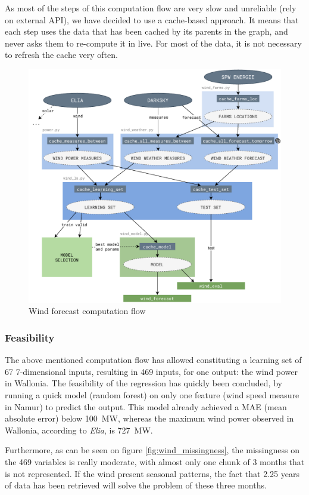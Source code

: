 \documentclass[a4paper, 12pt]{article}
\begin{document}
	As most of the steps of this computation flow are very slow and unreliable (rely on external API), we have decided to use a cache-based approach. It means that each step uses the data that has been cached by its parents in the graph, and never asks them to re-compute it in live. For most of the data, it is not necessary to refresh the cache very often.

	\begin{figure}[H]
		\centering
		\includegraphics[width=.8\textwidth]{resources/pdf/diagram_wind.pdf}
		\caption{Wind forecast computation flow}
		\label{fig:wind_computation_flow}
	\end{figure}


	\subsubsection{Feasibility}

	The above mentioned computation flow has allowed constituting a learning set of 67 7-dimensional inputs, resulting in 469 inputs, for one output: the wind power in Wallonia. The feasibility of the regression has quickly been concluded, by running a quick model (random forest) on only one feature (wind speed measure in Namur) to predict the output. This model already achieved a MAE (mean absolute error) below \SI{100}{\mega\watt}, whereas the maximum wind power observed in Wallonia, according to \emph{Elia}, is \SI{727}{\mega\watt}.

	Furthermore, as can be seen on figure \ref{fig:wind_missingness}, the missingness on the 469 variables is really moderate, with almost only one chunk of 3 months that is not represented. If the wind present seasonal patterns, the fact that 2.25 years of data has been retrieved will solve the problem of these three months.
	
\end{document}
